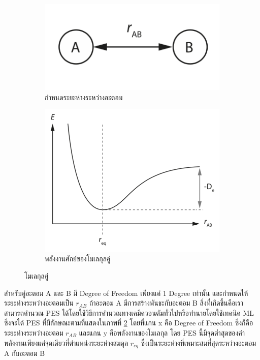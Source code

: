 \begin{figure}[H]
    \centering
    \begin{subfigure}{0.5\textwidth}
        \centering
        \includegraphics[width=0.9\linewidth]{fig/diatomic_molecule.png}
        \caption{กำหนดระยะห่างระหว่างอะตอม}
        \label{fig:diatomic_mol}
    \end{subfigure}%
    \begin{subfigure}{0.5\textwidth}
        \centering
        \includegraphics[width=0.9\linewidth]{fig/PES_diatomic_mol.png}
        \caption{พลังงานศักย์ของโมเลกุลคู่}
        \label{fig:PES_diatomic}
    \end{subfigure}
    \caption{โมเลกุลคู่}
    \label{fig:diatomic_mol_and_PES}
\end{figure}

สำหรับคู่อะตอม A และ B มี Degree of Freedom เพียงแค่ 1 Degree เท่านั้น และกำหนดให้ระยะห่างระหว่างอะตอมเป็น $r_{AB}$ ถ้าอะตอม A มีการสร้างพันธะกับอะตอม B สิ่งที่เกิดขึ้นคือเราสามารถคำนวณ PES ได้โดยใช้วิธีการคำนวณทางเคมีควอนตัมทั่วไปหรือทำนายโดยใช้เทคนิค ML ซึ่งจะได้ PES ที่มีลักษณะตามที่แสดงในภาพที่ \ref{fig:PES_diatomic} โดยที่แกน x คือ Degree of Freedom ซึ่งก็คือระยะห่างระหว่างอะตอม $r_{AB}$ และแกน y คือพลังงานของโมเลกุล โดย PES นี้มีจุดต่ำสุดของค่าพลังงานเพียงแค่จุดเดียวที่ตำแหน่งระยะห่างสมดุล $r_{eq}$ ซึ่งเป็นระยะห่างที่เหมาะสมที่สุดระหว่างอะตอม A กับอะตอม B

